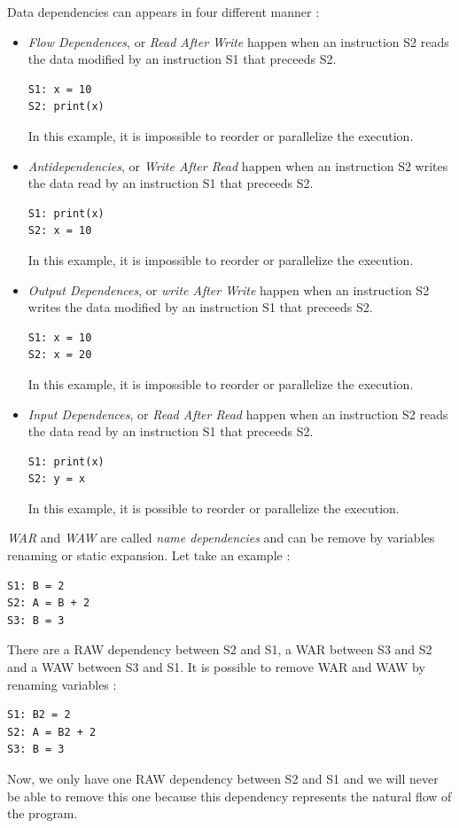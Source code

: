 Data dependencies can appears in four different manner :
\begin{itemize}
\item \emph{Flow Dependences}, or \emph{Read After Write} happen when an instruction S2 reads the data modified by an instruction S1 that preceeds S2. 
\begin{lstlisting}[frame=single]
S1: x = 10
S2: print(x)
\end{lstlisting}
In this example, it is impossible to reorder or parallelize the execution.

\item \emph{Antidependencies}, or \emph{Write After Read} happen when an instruction S2 writes the data read by an instruction S1 that preceeds S2.
\begin{lstlisting}[frame=single]
S1: print(x)
S2: x = 10
\end{lstlisting}
In this example, it is impossible to reorder or parallelize the execution.

\item \emph{Output Dependences}, or \emph{write After Write} happen when an instruction S2 writes the data modified by an instruction S1 that preceeds S2.
\begin{lstlisting}[frame=single]
S1: x = 10
S2: x = 20
\end{lstlisting}
In this example, it is impossible to reorder or parallelize the execution.

\item \emph{Input Dependences}, or \emph{Read After Read} happen when an instruction S2 reads the data read by an instruction S1 that preceeds S2. 
\begin{lstlisting}[frame=single]
S1: print(x)
S2: y = x
\end{lstlisting}
In this example, it is possible to reorder or parallelize the execution.
\end{itemize}

\emph{WAR} and \emph{WAW} are called \emph{name dependencies} and can be remove by variables renaming or static expansion. Let take an example :
\begin{lstlisting}[frame=single]
S1: B = 2
S2: A = B + 2
S3: B = 3
\end{lstlisting}

There are a RAW dependency between S2 and S1, a WAR between S3 and S2 and a WAW between S3 and S1. It is possible to remove WAR and WAW by renaming variables :
\begin{lstlisting}[frame=single]
S1: B2 = 2
S2: A = B2 + 2
S3: B = 3
\end{lstlisting}
Now, we only have one RAW dependency between S2 and S1 and we will never be able to remove this one because this dependency represents the natural flow of the program.
